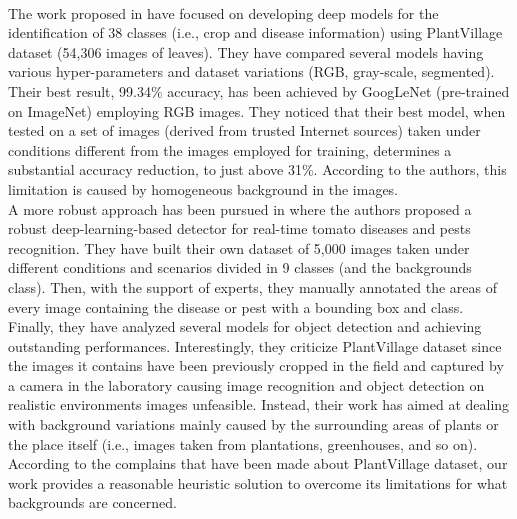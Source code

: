 \\\indent
The work proposed in \cite{ref10} have focused on developing deep models for the identification of 38 classes (i.e., crop and disease information) using PlantVillage dataset (54,306 images of leaves). They have compared several models having various hyper-parameters and dataset variations (RGB, gray-scale, segmented). Their best result, 99.34\% accuracy, has been achieved by GoogLeNet (pre-trained on ImageNet) employing RGB images. They noticed that their best model, when tested on a set of images (derived from trusted Internet sources) taken under conditions different from the images employed for training, determines a substantial accuracy reduction, to just above 31\%. According to the authors, this limitation is caused by homogeneous background in the images.
\\\indent
A more robust approach has been pursued in \cite{ref33} where the authors proposed a robust deep-learning-based detector for real-time tomato diseases and pests recognition. They have built their own dataset of 5,000 images taken under different conditions and scenarios divided in 9 classes (and the backgrounds class). Then, with the support of experts, they manually annotated the areas of every image containing the disease or pest with a bounding box and class. Finally, they have analyzed several models for object detection and achieving outstanding performances. Interestingly, they criticize PlantVillage dataset since the images it contains have been previously cropped in the field and captured by a camera in the laboratory causing image recognition and object detection on realistic environments images unfeasible. Instead, their work has aimed at dealing with background variations mainly caused by the surrounding areas of plants or the place itself (i.e., images taken from plantations, greenhouses, and so on).
\\\indent
According to the complains that have been made about PlantVillage dataset, our work provides a reasonable heuristic solution to overcome its limitations for what backgrounds are concerned.